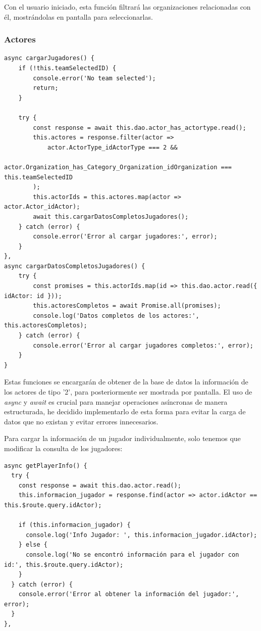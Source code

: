 Con el usuario iniciado, esta función filtrará las organizaciones relacionadas con él, mostrándolas en pantalla para seleccionarlas.
\subsubsection{Actores}
\begin{lstlisting}[style=Javascript-color, caption={Carga del listado de actores de tipo 2},label=Javascript-color_code_list_players]
async cargarJugadores() {
	if (!this.teamSelectedID) {
		console.error('No team selected');
		return;
	}

	try {
		const response = await this.dao.actor_has_actortype.read();
		this.actores = response.filter(actor =>
			actor.ActorType_idActorType === 2 &&
			actor.Organization_has_Category_Organization_idOrganization === this.teamSelectedID
		);
		this.actorIds = this.actores.map(actor => actor.Actor_idActor);
		await this.cargarDatosCompletosJugadores();
	} catch (error) {
		console.error('Error al cargar jugadores:', error);
	}
},
async cargarDatosCompletosJugadores() {
	try {
		const promises = this.actorIds.map(id => this.dao.actor.read({ idActor: id }));
		this.actoresCompletos = await Promise.all(promises);
		console.log('Datos completos de los actores:', this.actoresCompletos);
	} catch (error) {
		console.error('Error al cargar jugadores completos:', error);
	}
}
\end{lstlisting}

Estas funciones se encargarán de obtener de la base de datos la información de los actores de tipo '2', para posteriormente ser mostrada por pantalla. El uso de \textit{async} y \textit{await} es crucial para manejar operaciones asíncronas de manera estructurada, he decidido implementarlo de esta forma para evitar la carga de datos que no existan y evitar errores innecesarios.

Para cargar la información de un jugador individualmente, solo tenemos que modificar la consulta de los jugadores:

\begin{lstlisting}[style=Javascript-color, caption={Carga de la información de ún solo actor},label=Javascript-color_code_list_singlplayers]
async getPlayerInfo() {
  try {
    const response = await this.dao.actor.read();
    this.informacion_jugador = response.find(actor => actor.idActor == this.$route.query.idActor);
    
    if (this.informacion_jugador) {
      console.log('Info Jugador: ', this.informacion_jugador.idActor);
    } else {
      console.log('No se encontró información para el jugador con id:', this.$route.query.idActor);
    }
  } catch (error) {
    console.error('Error al obtener la información del jugador:', error);
  }
},
\end{lstlisting}
